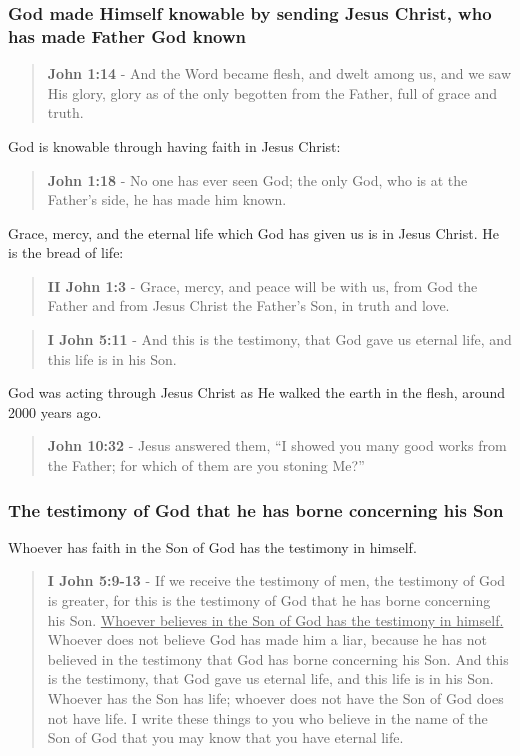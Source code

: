 \documentclass[11pt]{article}
\begin{document}
\subsubsection{God made Himself knowable by sending Jesus Christ, who has made Father God known}
\label{sec:org4c7c837}

\begin{quote}
\textbf{John 1:14} - And the Word became flesh, and dwelt among us, and we saw His glory, glory as of the only begotten from the Father, full of grace and truth.
\end{quote}

God is knowable through having faith in Jesus Christ:

\begin{quote}
\textbf{John 1:18} - No one has ever seen God; the only God, who is at the Father's side, he has made him known.
\end{quote}

Grace, mercy, and the eternal life which God has given us is in Jesus Christ. He is the bread of life:

\begin{quote}
\textbf{II John 1:3} - Grace, mercy, and peace will be with us, from God the Father and from Jesus Christ the Father's Son, in truth and love.
\end{quote}

\begin{quote}
\textbf{I John 5:11} - And this is the testimony, that God gave us eternal life, and this life is in his Son.
\end{quote}

God was acting through Jesus Christ as He walked the earth in the flesh, around 2000 years ago.

\begin{quote}
\textbf{John 10:32} - Jesus answered them, “I showed you many good works from the Father; for which of them are you stoning Me?”
\end{quote}

\subsubsection{The testimony of God that he has borne concerning his Son}
\label{sec:orga9c0c3e}
Whoever has faith in the Son of God has the testimony in himself.

\begin{quote}
\textbf{I John 5:9-13} - If we receive the testimony of men, the testimony of God is greater, for this is the testimony of God that he has borne concerning his Son. \uline{Whoever believes in the Son of God has the testimony in himself.} Whoever does not believe God has made him a liar, because he has not believed in the testimony that God has borne concerning his Son. And this is the testimony, that God gave us eternal life, and this life is in his Son. Whoever has the Son has life; whoever does not have the Son of God does not have life. I write these things to you who believe in the name of the Son of God that you may know that you have eternal life.
\end{quote}
\end{document}
